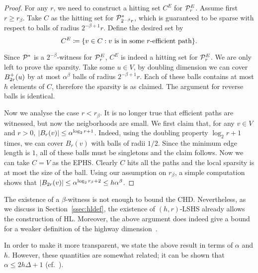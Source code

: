 \begin{proof}
	For any $r$, we need to construct a hitting set $C^E$ for $\mathcal{P}^E_r$.
	Assume first $r\geq r_\beta$.
	Take $C$ as the hitting set for $\mathcal{P}^*_{2^{-\beta}r}$, which is guaranteed to be sparse with respect to balls of radius $2^{-\beta+1}r$.
	Define the desired set by
	\[
	C^E\coloneqq\{v\in C: v \text{ is in some $r$-efficient path} \}.
	\]
	
	Since $\mathcal{P}^*$ is a $2^{-\beta}$-witness for $\mathcal{P}^E_r$, $C^E$ is indeed a hitting set for $\mathcal{P}^E_r$.
	We are only left to prove the sparsity.
	Take some $u\in V$, by doubling dimension we can cover $B^+_{2r}(u)$ by at most $\alpha^\beta$ balls of radius $2^{-\beta+1}r$.
	Each of these balls contains at most $h$ elements of $C$, therefore the sparsity is as claimed.
	The argument for reverse balls is identical.
	
	Now we analyse the case $r< r_\beta$.
	It is no longer true that efficient paths are witnessed, but now the neigborhoods are small.
	We first claim that, for any $v\in V$ and $r>0$, $\lvert B_{r}(v)\rvert\leq \alpha^{\log_2r+1}$.
	Indeed, using the doubling property $\log_2r+1$ times, we can cover $B_r(v)$ with balls of radii $1/2$.
	Since the minimum edge length is $1$, all of these balls must be singletons and the claim follows.
	Now we can take $C=V$ as the EPHS.
	Clearly $C$ hits all the paths and the local sparsity is at most the size of the ball.
	Using our assumption on $r_\beta$, a simple computation shows that $\lvert B_{2r}(v)\rvert\leq \alpha^{\log_2r_\beta+2}\leq h\alpha^\beta$. 
\end{proof}
\begin{remark}
	The existence of a $\beta$-witness is not enough to bound the CHD. Nevertheless, as we discuss in Section~\ref{ssec:hldef}, the existence of $(h,r)$-LSHS already allows the construction of HL. Moreover, the above argument does indeed give a bound for a weaker definition of the highway dimension~\cite{highway2010}.
\end{remark}
\begin{remark}
	In order to make it more transparent, we state the above result in terms of $\alpha$ and $h$. 
	However, these quantities are somewhat related; it can be shown that $\alpha\leq 2h\Delta+1$ (cf.~\cite{skeleton}).
\end{remark}

